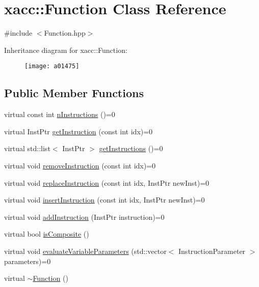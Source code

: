 \hypertarget{a01475}{}\section{xacc\+:\+:Function Class Reference}
\label{a01475}


{\ttfamily \#include $<$Function.\+hpp$>$}

Inheritance diagram for xacc\+:\+:Function\+:\begin{figure}[H]
\begin{center}
\leavevmode
\texttt{[image: a01475]}
\end{center}
\end{figure}
\subsection*{Public Member Functions}
\begin{DoxyCompactItemize}
\item 
virtual const int \hyperlink{a01475_a8901985525f59713e14c61713e07c086}{n\+Instructions} ()=0
\item 
virtual Inst\+Ptr \hyperlink{a01475_afa549fc91b5a05f26d8139954a7e0ed5}{get\+Instruction} (const int idx)=0
\item 
virtual std\+::list$<$ Inst\+Ptr $>$ \hyperlink{a01475_aaf80bd3d49113a92b520785572663032}{get\+Instructions} ()=0
\item 
virtual void \hyperlink{a01475_ab6478b09bb28e194bb555b3180737733}{remove\+Instruction} (const int idx)=0
\item 
virtual void \hyperlink{a01475_a2ef6a4923a6734f90f6ee3d94d263af0}{replace\+Instruction} (const int idx, Inst\+Ptr new\+Inst)=0
\item 
virtual void \hyperlink{a01475_acde702e44bdbc2759b338365218d7ebe}{insert\+Instruction} (const int idx, Inst\+Ptr new\+Inst)=0
\item 
virtual void \hyperlink{a01475_aa8c9ec2d08be75c69399d4254b0216f5}{add\+Instruction} (Inst\+Ptr instruction)=0
\item 
virtual bool \hyperlink{a01475_aa75500c657b5c3e0e36213e1506aad97}{is\+Composite} ()
\item 
virtual void \hyperlink{a01475_af6ae9453027789a2aaec30e59c9e45e3}{evaluate\+Variable\+Parameters} (std\+::vector$<$ Instruction\+Parameter $>$ parameters)=0
\item 
virtual \hyperlink{a01475_a04b25ba4da1ddfa4ec4ec6d6ffb25bc3}{$\sim$\+Function} ()
\end{DoxyCompactItemize}
